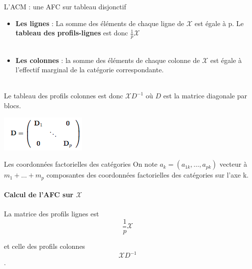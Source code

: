 \documentclass[10pt]{beamer}
\begin{document}
\begin{frame}{L'ACM : une AFC sur tableau disjonctif}

 \begin{itemize}
 \item \textbf{Les lignes }:  La somme des éléments de chaque ligne de $\mathcal{X}$
est égale à p. Le \textbf{tableau des profils-lignes} est donc $\frac{1}{p} \mathcal{X}$\\~\\


\item \textbf{Les colonnes} : la somme des éléments de chaque colonne de $\mathcal{X}$ est égale à l'effectif marginal de la catégorie correspondante.\\~\\
 \end{itemize}

Le tableau des profils colonnes est donc $\mathcal{X}D^{-1}$
où $D$ est la matrice diagonale par blocs.

\centering

\includegraphics[scale=0.8]{Disj6} 

\end{frame}



\begin{frame}{Les coordonnées factorielles des catégories}
\centering 
 On note $a_k = (a_{1k}, \ldots , a_{pk})$ vecteur à $m_1 + \ldots + m_p$ composantes des coordonnées factorielles des catégories sur l'axe k. \\~\\
 
 \textbf{Calcul de l'AFC sur $\mathcal{X}$  }\\~\\
 
La matrice des profils lignes est $$\frac{1}{p} \mathcal{X}$$

et  celle des profils colonnes $$\mathcal{X}D^{-1}$$ . 

 
 
\end{frame}


\end{document}
